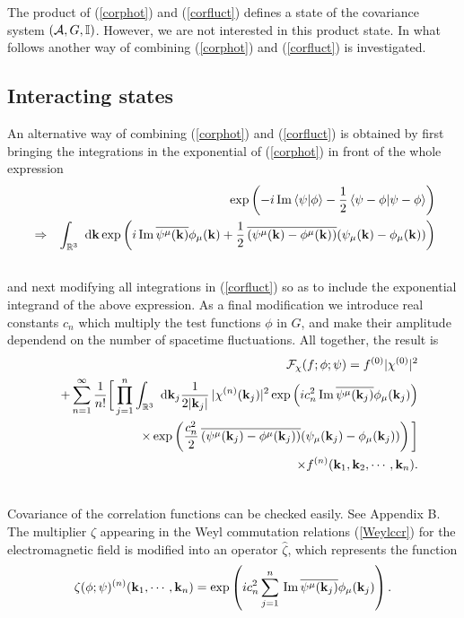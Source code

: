 \documentclass[12pt,a4paper]{article}
\def\Ro{{\mathbb R}}
\def\Io{{\mathbb I}}
\def\kk{{\bf k}}
\renewcommand{\Im}{\,{\rm Im}\,}
\begin{document}
The product of (\ref{corphot}) and (\ref{corfluct}) defines
a state of the covariance system $({\cal A},G,\Io)$.
However, we are not interested in this product state.
In what follows another way of combining (\ref{corphot}) and (\ref{corfluct}) 
is investigated.

\subsection{Interacting states}

An alternative way of combining (\ref{corphot}) and (\ref{corfluct})
is obtained by first bringing the integrations in the
exponential of (\ref{corphot}) in front of the whole expression
\begin{eqnarray}
& &\exp\left(-i\Im\langle \psi|\phi\rangle
-\frac{1}{2}\,\langle \psi-\phi|
\psi-\phi\rangle\right)\cr
&\Rightarrow&
\int_{\Ro^3}\hbox{ d}\kk
\exp\left(i\Im\overline{ \psi^\mu(\kk)}\phi_\mu(\kk)
+\frac{1}{2}\,\overline{( \psi^\mu(\kk)-\phi^\mu(\kk))}
(\psi_\mu(\kk)-\phi_\mu(\kk))
\right)\cr
& &
\end{eqnarray}
and next modifying all integrations in (\ref{corfluct})
so as to include the exponential integrand of the above expression.
As a final modification we introduce real constants $c_n$
which multiply the test functions $\phi$ in $G$, and make their
amplitude dependend on the number of spacetime fluctuations.
All together, the result is
\begin{eqnarray}
& &{\cal F}_\chi(f;\phi;\psi)
=f^{(0)}|\chi^{(0)}|^2\cr
& &
+\sum_{n=1}^\infty\frac{1}{n!}\bigg[\prod_{j=1}^n\int_{\Ro^3}\hbox{ d}\kk_j
\frac{1}{2|\kk_j|}\,|\chi^{(n)}(\kk_j)|^2
\exp\left(ic_n^2\Im\overline{ \psi^\mu(\kk_j)}\phi_\mu(\kk_j)
\right)\cr
& &\times\exp\left(
\frac{c_n^2}{2}\,\overline{( \psi^\mu(\kk_j)-\phi^\mu(\kk_j))}
(\psi_\mu(\kk_j)-\phi_\mu(\kk_j))
\right)
\bigg]\cr
& &\times f^{(n)}(\kk_1,\kk_2,\cdots,\kk_n).\cr
& &
\label{corfunext}
\end{eqnarray}

Covariance of the correlation functions can be checked easily. 
See Appendix B. The multiplier $\zeta$ appearing in the Weyl 
commutation relations (\ref{Weylccr}) for the electromagnetic 
field is modified into an operator $\hat\zeta$, which represents 
the function
\begin{equation}
\zeta(\phi;\psi)^{(n)}(\kk_1,\cdots,\kk_n)
=\exp\left(ic_n^2\sum_{j=1}^n\Im\overline{\psi^\mu(\kk_j)}\phi_\mu(\kk_j)\right).
\end{equation}
\end{document}
